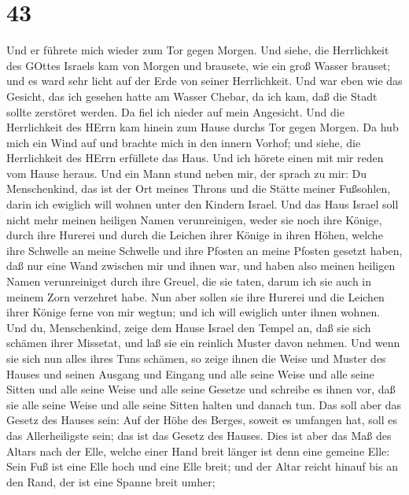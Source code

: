 \hypertarget{section-42}{%
\section{43}\label{section-42}}

 Und er führete mich wieder zum Tor gegen Morgen.
 Und siehe, die Herrlichkeit des GOttes Israels kam von
Morgen und brausete, wie ein groß Wasser brauset; und es ward sehr licht
auf der Erde von seiner Herrlichkeit.  Und war eben wie das
Gesicht, das ich gesehen hatte am Wasser Chebar, da ich kam, daß die
Stadt sollte zerstöret werden. Da fiel ich nieder auf mein Angesicht.
 Und die Herrlichkeit des HErrn kam hinein zum Hause durchs
Tor gegen Morgen.  Da hub mich ein Wind auf und brachte mich
in den innern Vorhof; und siehe, die Herrlichkeit des HErrn erfüllete
das Haus.  Und ich hörete einen mit mir reden vom Hause
heraus. Und ein Mann stund neben mir,  der sprach zu mir: Du
Menschenkind, das ist der Ort meines Throns und die Stätte meiner
Fußsohlen, darin ich ewiglich will wohnen unter den Kindern Israel. Und
das Haus Israel soll nicht mehr meinen heiligen Namen verunreinigen,
weder sie noch ihre Könige, durch ihre Hurerei und durch die Leichen
ihrer Könige in ihren Höhen,  welche ihre Schwelle an meine
Schwelle und ihre Pfosten an meine Pfosten gesetzt haben, daß nur eine
Wand zwischen mir und ihnen war, und haben also meinen heiligen Namen
verunreiniget durch ihre Greuel, die sie taten, darum ich sie auch in
meinem Zorn verzehret habe.  Nun aber sollen sie ihre
Hurerei und die Leichen ihrer Könige ferne von mir wegtun; und ich will
ewiglich unter ihnen wohnen.  Und du, Menschenkind, zeige
dem Hause Israel den Tempel an, daß sie sich schämen ihrer Missetat, und
laß sie ein reinlich Muster davon nehmen.  Und wenn sie
sich nun alles ihres Tuns schämen, so zeige ihnen die Weise und Muster
des Hauses und seinen Ausgang und Eingang und alle seine Weise und alle
seine Sitten und alle seine Weise und alle seine Gesetze und schreibe es
ihnen vor, daß sie alle seine Weise und alle seine Sitten halten und
danach tun.  Das soll aber das Gesetz des Hauses sein: Auf
der Höhe des Berges, soweit es umfangen hat, soll es das Allerheiligste
sein; das ist das Gesetz des Hauses.  Dies ist aber das Maß
des Altars nach der Elle, welche einer Hand breit länger ist denn eine
gemeine Elle: Sein Fuß ist eine Elle hoch und eine Elle breit; und der
Altar reicht hinauf bis an den Rand, der ist eine Spanne breit umher;
